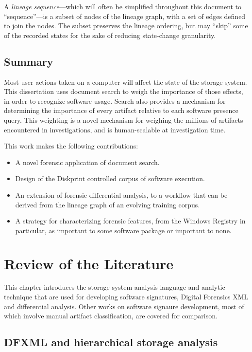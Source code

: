 \documentclass[11pt]{ucthesis}
\theoremstyle{plain}
\theoremstyle{definition}
\begin{document}
A \emph{lineage sequence}---which will often be simplified throughout this document to ``sequence''---is a subset of nodes of the lineage graph, with a set of edges defined to join the nodes.  The subset preserves the lineage ordering, but may ``skip'' some of the recorded states for the sake of reducing state-change granularity.


\section{Summary}

Most user actions taken on a computer will affect the state of the storage system.  This dissertation uses document search to weigh the importance of those effects, in order to recognize software usage.  Search also provides a mechanism for determining the importance of every artifact relative to each software presence query.  This weighting is a novel mechanism for weighing the millions of artifacts encountered in investigations, and is human-scalable at investigation time.

This work makes the following contributions:

\begin{itemize}
\item A novel forensic application of document search.
\item Design of the Diskprint controlled corpus of software execution.
\item An extension of forensic differential analysis, to a workflow that can be derived from the lineage graph of an evolving training corpus.
\item A strategy for characterizing forensic features, from the Windows Registry in particular, as important to some software package or important to none.
\end{itemize}


\chapter{Review of the Literature}

This chapter introduces the storage system analysis language and analytic technique that are used for developing software signatures, Digital Forensics XML and differential analysis.  Other works on software signaure development, most of which involve manual artifact classification, are covered for comparison.


\section{DFXML and hierarchical storage analysis}
\end{document}
